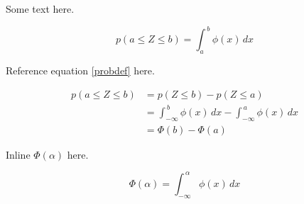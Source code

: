 \documentclass{article}
\begin{document}
\begin{flushleft}

Some text here.

\begin{equation} \label{probdef}
  p(a \le Z \le b) = \int_{a}^{\,b} \phi(x) \,dx
\end{equation}

Reference equation \autoref{probdef} here.

\begin{align*}
  p(a \le Z \le b)  &=  p(Z \le b) - p(Z \le a) \\
                    &=  \int_{-\infty}^{\,b} \phi(x) \,dx
                        -
                        \int_{-\infty}^{\,a} \phi(x) \,dx \\
                    &=  \Phi(b) - \Phi(a)
\end{align*}

Inline $\Phi(\alpha)$ here.

\begin{equation*}
  \Phi(\alpha)  = \int_{-\infty}^{\,\alpha} \phi(x) \,dx
\end{equation*}

% 

\end{flushleft}
\end{document}
